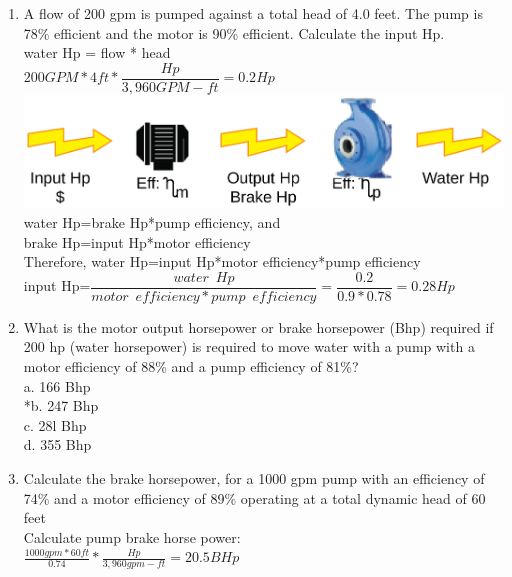 \documentclass{article}
\begin{document}
\begin{enumerate}
\item A flow of 200 gpm  is pumped against a total head of 4.0 feet. The pump is 78\% efficient and the motor is 90\% efficient. Calculate the input Hp.\\
\vspace{0.4cm}
water Hp = flow * head\\
\vspace{0.2cm}
$200GPM*4ft*\dfrac{Hp}{3,960 GPM-ft}=0.2Hp$\\
\vspace{0.4cm}\includegraphics[scale=0.08]{PumpProblem}\\
water Hp=brake Hp*pump efficiency, and\\
brake Hp=input Hp*motor efficiency\\
Therefore, water Hp=input Hp*motor efficiency*pump efficiency\\
\vspace{0.4cm}
input Hp=$\dfrac{water \enspace Hp}{motor \enspace efficiency*pump \enspace efficiency}=\dfrac{0.2}{0.9*0.78}=\boxed{0.28Hp}$
\vspace{0.2cm}


\item What is the motor output horsepower or brake horsepower (Bhp) required if 200 hp (water horsepower) is required to move water with a pump with a motor efficiency of 88\% and a pump efficiency of 81\%?\\
a.	166 Bhp\\
*b.	247 Bhp\\
c.	28l Bhp\\
d.	355 Bhp\\

\item Calculate the brake horsepower, for a 1000 gpm pump with an efficiency of 74\% and a motor efficiency of 89\% operating at a total dynamic head of 60 feet\\
\vspace{0.4cm}
Calculate pump brake horse power:\\
\vspace{0.4cm}
$\frac{1000gpm*60ft}{0.74}*\frac{Hp}{3,960 gpm-ft}=\boxed{20.5BHp}$
\vspace{0.4cm}


\end{enumerate}
\end{document}
